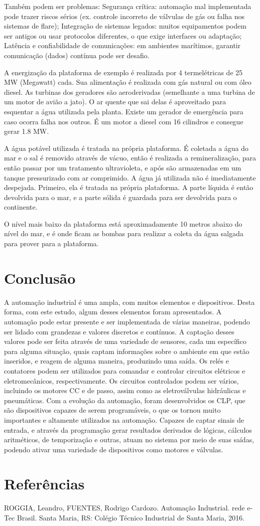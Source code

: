 \documentclass{article}
\begin{document}
Também podem ser problemas: Segurança crítica: automação mal implementada pode trazer riscos sérios (ex. controle incorreto de válvulas de gás ou falha nos sistemas de flare); Integração de sistemas legados: muitos equipamentos podem ser antigos ou usar protocolos diferentes, o que exige interfaces ou adaptação; Latência e confiabilidade de comunicações: em ambientes marítimos, garantir comunicação (dados) contínua pode ser desafio. 

A energização da plataforma de exemplo é realizada por 4 termelétricas de 25 MW (Megawatt) cada. Sua alimentação é realizada com gás natural ou com óleo diesel. As turbinas dos geradores são aeroderivadas (semelhante a uma turbina de um motor de avião a jato). O ar quente que sai delas é aproveitado para esquentar a água utilizada pela planta. Existe um gerador de emergência para caso ocorra falha nos outros. É um motor a diesel com 16 cilindros e consegue gerar 1.8 MW. 

A água potável utilizada é tratada na própria plataforma. É coletada a água do mar e o sal é removido através de vácuo, então é realizada a remineralização, para então passar por um tratamento ultravioleta, e após são armazenadas em um tanque pressurizado com ar comprimido. A água já utilizada não é imediatamente despejada. Primeiro, ela é tratada na própria plataforma. A parte líquida é então devolvida para o mar, e a parte sólida é guardada para ser devolvida para o continente.  

O nível mais baixo da plataforma	 está aproximadamente 10 metros abaixo do nível do mar, e é onde ficam as bombas para realizar a coleta da água salgada para prover para a plataforma.

\section{Conclusão}

A automação industrial é uma ampla, com muitos elementos e dispositivos. Desta forma, com este estudo, algum desses elementos foram apresentados. A automação pode estar presente e ser implementada de várias maneiras, podendo ser lidado com grandezas e valores discretos e contínuos. A captação desses valores pode ser feita através de uma variedade de sensores, cada um específico para alguma situação, quais captam informações sobre o ambiente em que estão inseridos, e reagem de alguma maneira, produzindo uma saída. Os relés e contatores podem ser utilizados para comandar e controlar circuitos elétricos e eletromecânicos, respectivamente. Os circuitos controlados podem ser vários, incluindo os motores CC e de passo, assim como as eletroválvulas hidráulicas e pneumáticas. Com a evolução da automação, foram desenvolvidos os CLP, que são dispositivos capazes de serem programáveis, o que os tornou muito importantes e altamente utilizados na automação. Capazes de captar sinais de entrada, e através da programação gerar resultados derivados de lógicas, cálculos aritméticos, de temporização e outras, atuam no sistema por meio de suas saídas, podendo ativar uma variedade de dispositivos como motores e válvulas.


\section{Referências}

ROGGIA, Leandro, FUENTES, Rodrigo Cardozo. Automação Industrial. rede e-Tec Brasil. Santa Maria, RS: Colégio Técnico Industrial de Santa Maria, 2016. 
\end{document}
